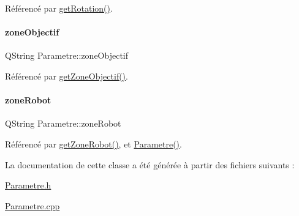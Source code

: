 Référencé par \hyperlink{class_parametre_afdfb5ca638add3954d257ff95a8d8c53}{get\+Rotation()}.

\mbox{\label{class_parametre_a5c1b739e1a70e16ca09e6752743363aa}} 
\paragraph{\texorpdfstring{zone\+Objectif}{zoneObjectif}}
{\footnotesize\ttfamily Q\+String Parametre\+::zone\+Objectif\hspace{0.3cm}{\ttfamily [read]}}



Référencé par \hyperlink{class_parametre_a2655cf5e0a69873da17dff9f51b4af70}{get\+Zone\+Objectif()}.

\mbox{\label{class_parametre_a85c2e24c35cad5304b5e2edf7289c9c3}} 
\paragraph{\texorpdfstring{zone\+Robot}{zoneRobot}}
{\footnotesize\ttfamily Q\+String Parametre\+::zone\+Robot\hspace{0.3cm}{\ttfamily [read]}}



Référencé par \hyperlink{class_parametre_a88864c08fcd1b45a98bc6db3cdf6e29c}{get\+Zone\+Robot()}, et \hyperlink{class_parametre_a8c0dee4edaf9b1222ec1b6e1d20fe9c5}{Parametre()}.



La documentation de cette classe a été générée à partir des fichiers suivants \+:\begin{DoxyCompactItemize}
\item 
\hyperlink{_parametre_8h}{Parametre.\+h}\item 
\hyperlink{_parametre_8cpp}{Parametre.\+cpp}\end{DoxyCompactItemize}
